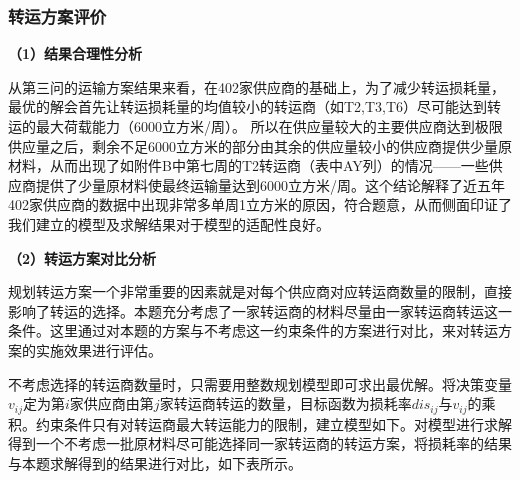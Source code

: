 \documentclass[withoutpreface,bwprint]{cumcmthesis} %
\begin{document}
\subsubsection{转运方案评价}
\noindent\textbf{（1）结果合理性分析}

从第三问的运输方案结果来看，在402家供应商的基础上，为了减少转运损耗量，最优的解会首先让转运损耗量的均值较小的转运商（如T2,T3,T6）尽可能达到转运的最大荷载能力（6000立方米/周）。 所以在供应量较大的主要供应商达到极限供应量之后，剩余不足6000立方米的部分由其余的供应量较小的供应商提供少量原材料，从而出现了如附件B中第七周的T2转运商（表中AY列）的情况——一些供应商提供了少量原材料使最终运输量达到6000立方米/周。这个结论解释了近五年402家供应商的数据中出现非常多单周1立方米的原因，符合题意，从而侧面印证了我们建立的模型及求解结果对于模型的适配性良好。

\noindent\textbf{（2）转运方案对比分析}

规划转运方案一个非常重要的因素就是对每个供应商对应转运商数量的限制，直接影响了转运的选择。本题充分考虑了一家转运商的材料尽量由一家转运商转运这一条件。这里通过对本题的方案与不考虑这一约束条件的方案进行对比，来对转运方案的实施效果进行评估。

不考虑选择的转运商数量时，只需要用整数规划模型即可求出最优解。将决策变量$v_{ij}$定为第$i$家供应商由第$j$家转运商转运的数量，目标函数为损耗率$dis_{ij}$与$v_{ij}$的乘积。约束条件只有对转运商最大转运能力的限制，建立模型如下。对模型进行求解得到一个不考虑一批原材料尽可能选择同一家转运商的转运方案，将损耗率的结果与本题求解得到的结果进行对比，如下表所示。
\end{document}
